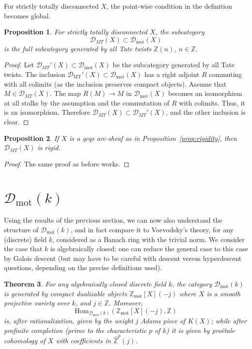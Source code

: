 \documentclass[11pt]{amsart}
\numberwithin{equation}{section}
\newtheorem{theorem}{Theorem}
\numberwithin{theorem}{section}
\newtheorem{proposition}[theorem]{Proposition}
\theoremstyle{definition}
\begin{document}
For strictly totally disconnected $X$, the point-wise condition in the definition becomes global.

\begin{proposition} For strictly totally disconnected $X$, the subcategory
\[
\mathcal D_{MT}(X)\subset \mathcal D_{\mathrm{mot}}(X)
\]
is the full subcategory generated by all Tate twists $\mathbb Z(n)$, $n\in \mathbb Z$.
\end{proposition}

\begin{proof} Let $\mathcal D_{MT}'(X)\subset \mathcal D_{\mathrm{mot}}(X)$ be the subcategory generated by all Tate twists. The inclusion $\mathcal D_{\mathrm{MT}}'(X)\subset \mathcal D_{\mathrm{mot}}(X)$ has a right adjoint $R$ commuting with all colimits (as the inclusion preserves compact objects). Assume that $M\in \mathcal D_{MT}(X)$. The map $R(M)\to M$ in $\mathcal D_{\mathrm{mot}}(X)$ becomes an isomorphism at all stalks by the assumption and the commutation of $R$ with colimits. Thus, it is an isomorphism. Therefore $\mathcal D_{MT}(X)\subset \mathcal D_{MT}'(X)$, and the other inclusion is clear.
\end{proof}

\begin{proposition} If $X$ is a qcqs arc-sheaf as in Proposition~\ref{prop:rigidity}, then $\mathcal D_{MT}(X)$ is rigid.
\end{proposition}

\begin{proof} The same proof as before works.
\end{proof}


\section{$\mathcal D_{\mathrm{mot}}(k)$}

Using the results of the previous section, we can now also understand the structure of $\mathcal D_{\mathrm{mot}}(k)$, and in fact compare it to Voevodsky's theory, for any (discrete) field $k$, considered as a Banach ring with the trivial norm. We consider the case that $k$ is algebraically closed; one can reduce the general case to this case by Galois descent (but may have to be careful with descent versus hyperdescent questions, depending on the precise definitions used).

\begin{theorem} For any algebraically closed discrete field $k$, the category $\mathcal D_{\mathrm{mot}}(k)$ is generated by compact dualizable objects $\mathbb Z_{\mathrm{mot}}[X](-j)$ where $X$ is a smooth projective variety over $k$, and $j\in \mathbb Z$. Moreover,
\[
\mathrm{Hom}_{\mathcal D_{\mathrm{mot}}(k)}(\mathbb Z_{\mathrm{mot}}[X](-j),\mathbb Z)
\]
is, after rationalization, given by the weight $j$ Adams piece of $K(X)$; while after profinite completion (prime to the characteristic $p$ of $k$) it is given by pro\'etale cohomology of $X$ with coefficients in $\hat{\mathbb Z}^p(j)$.
\end{theorem}
\end{document}
